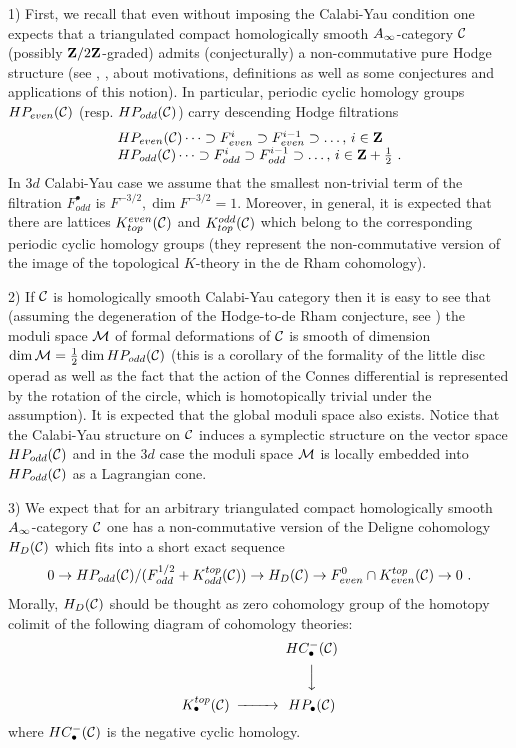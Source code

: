 \documentclass[12pt]{article}
\begin{document}
1) First, we recall that even without imposing the Calabi-Yau condition one expects that a triangulated compact homologically smooth $A_{\infty}$-category ${\mathcal C}$ (possibly ${\bf Z}/2{\bf Z}$-graded) admits (conjecturally) a non-commutative pure Hodge structure (see \cite{Ko2}, \cite{KKP}, \cite{KoSo3} about motivations, definitions as well as some conjectures and applications of this notion).
In particular, periodic cyclic homology groups $HP_{even}({\mathcal C})$ (resp. $HP_{odd}({\mathcal C})$) carry descending Hodge filtrations  
$$\begin{array}{l}HP_{even}({\mathcal C})\dots\supset F^i_{even}\supset F^{i-1}_{even}\supset\dots,\, i\in {\bf Z}\\
HP_{odd}({\mathcal C})\dots\supset F^i_{odd}\supset F^{i-1}_{odd}\supset\dots,\, i\in {\bf Z}+{1\over{2}}\,\,.
\end{array}$$ 
In $3d$ Calabi-Yau case we assume that the smallest non-trivial term of the filtration $F^{\bullet}_{odd}$ is $F^{-3/2}, \dim F^{-3/2}=1$. Moreover, in general, it is expected that there are lattices $K_{top}^{even}({\mathcal C})$ and $K_{top}^{odd}({\mathcal C})$ which belong to the corresponding periodic cyclic homology groups (they represent the non-commutative version of the image of the topological $K$-theory in the de Rham cohomology).

2) If ${\mathcal C}$ is homologically smooth Calabi-Yau category then it is easy to see that (assuming the degeneration of the Hodge-to-de Rham conjecture, see \cite{KoSo3}) the moduli space ${\cal M}$ of formal deformations of ${\mathcal C}$ is smooth of dimension $\dim {\cal M}={1\over{2}}\dim HP_{odd}({\mathcal C})$ (this is a corollary of the formality of the little disc operad as well as the fact that the action of the Connes differential is represented by the rotation of the circle, which is homotopically trivial under the assumption). It is expected that the global moduli space also exists.
Notice that the Calabi-Yau structure on ${\mathcal C}$ induces a symplectic structure on the vector space $HP_{odd}({\mathcal C})$ and in the $3d$ case the moduli space ${\cal M}$ is locally embedded into $HP_{odd}({\mathcal C})$ as a Lagrangian cone.


3) We expect that for an arbitrary triangulated compact homologically smooth $A_{\infty}$-category ${\mathcal C}$ one has a non-commutative version of the Deligne
 cohomology $H_{D}({\mathcal C})$ which  fits into a short exact sequence
$$0\to HP_{odd}({\mathcal C})/(F^{1/2}_{odd}+ K^{top}_{odd}({\mathcal C}))\to H_D({\mathcal C})\to F^0_{even}\cap K^{top}_{even}({\mathcal C})\to 0\,\,.$$
Morally, $H_D({\mathcal C})$ should be thought as zero cohomology group of the homotopy colimit of the following diagram of cohomology theories:
$$\begin{CD}  @. HC_\bullet^-(\CC)\\
  @. @VVV  \\
K^{top}_\bullet(\CC) @>>>  HP_\bullet(\CC)
\end{CD} $$
where $HC_\bullet^-({\mathcal C})$ is the negative cyclic homology.
\end{document}

